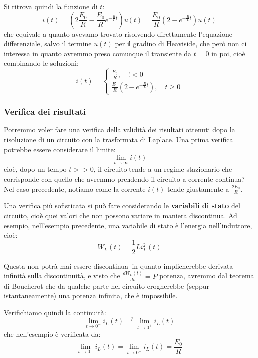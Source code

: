 \documentclass[a4paper,11pt]{article}
\begin{document}
Si ritrova quindi la funzione di $t$:
$$
i(t) = \left( 2\frac{E_0}{R} - \frac{E_0}{R} e^{-\frac{R}{L}t} \right) u(t) = \frac{E_0}{R} \left( 2 - e^{-\frac{R}{L}t} \right) u(t)
$$
che equivale a quanto avevamo trovato risolvendo direttamente l'equazione differenziale, salvo il termine $u(t)$ per il gradino di Heaviside, che però non ci interessa in quanto avremmo preso comunque il transiente da $t = 0$ in poi, cioè combinando le soluzioni:
\[
	i(t) = 
	\begin{cases}
		\frac{E_0}{R}, \quad t < 0 \\ 
		\frac{E_0}{R} \left( 2 - e^{-\frac{R}{L}t} \right), \quad t \geq 0
	\end{cases}
\]

\subsubsection{Verifica dei risultati}
Potremmo voler fare una verifica della validità dei risultati ottenuti dopo la risoluzione di un circuito con la trasformata di Laplace.
Una prima verifica potrebbe essere considerare il limite:
$$
\lim_{t\rightarrow\infty} i(t)
$$
cioè, dopo un tempo $t >> 0$, il circuito tende a un regime stazionario che corrisponde con quello che avremmo prendendo il circuito a corrente continua? 
Nel caso precedente, notiamo come la corrente $i(t)$ tende giustamente a $\frac{2 E_0}{R}$.

Una verifica più sofisticata si può fare considerando le \textbf{variabili di stato} del circuito, cioè quei valori che non possono variare in maniera discontinua. 
Ad esempio, nell'esempio precedente, una variabile di stato è l'energia nell'induttore, cioè:
$$
W_L(t) = \frac{1}{2}L i_L^2(t)
$$

Questa non potrà mai essere discontinua, in quanto implicherebbe derivata infinità sulla discontinuità, e visto che $\frac{d W_L(t)}{dt} = P$ potenza, avremmo dal teorema di Boucherot che da qualche parte nel circuito erogherebbe (seppur istantaneamente) una potenza infinita, che è impossibile.

Verifichiamo quindi la continuità:
$$
\lim_{t \rightarrow 0^-} i_L(t) =^? \lim_{t \rightarrow 0^+} i_L(t)
$$
che nell'esempio è verificata da:
$$
\lim_{t \rightarrow 0^-} i_L(t) = \lim_{t \rightarrow 0^+} i_L(t) = \frac{E_0}{R}
$$
\end{document}
